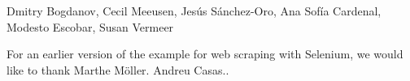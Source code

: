 Dmitry Bogdanov, Cecil Meeusen, Jesús Sánchez-Oro, Ana Sofía Cardenal, Modesto Escobar, Susan Vermeer

For an earlier version of the example for web scraping with Selenium, we would like to thank Marthe Möller.
Andreu Casas..
